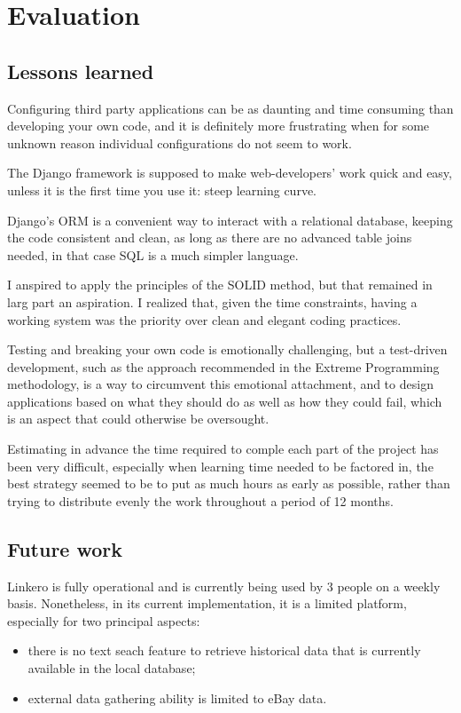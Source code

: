 \chapter{Evaluation}

\section{Lessons learned}
Configuring third party applications can be as daunting and time consuming than
developing your own code, and it is definitely more frustrating when for some
unknown reason individual configurations do not seem to work.

The Django framework is supposed to make web-developers' work quick and easy,
unless it is the first time you use it: steep learning curve.

Django's ORM is a convenient way to interact with a relational database, keeping
the code consistent and clean, as long as there are no advanced table joins
needed, in that case SQL is a much simpler language.

I anspired to apply the principles of the SOLID method, but that remained in
larg part an aspiration. I realized that, given the time constraints, having a
working system was the priority over clean and elegant coding practices.

Testing and breaking your own code is emotionally challenging, but a test-driven
development, such as the approach recommended in the Extreme Programming
methodology, is a way to circumvent this emotional attachment, and to design
applications based on what they should do as well as how they could fail, which
is an aspect that could otherwise be oversought.

Estimating in advance the time required to comple each part of the project has
been very difficult, especially when learning time needed to be factored in, the
best strategy seemed to be to put as much hours as early as possible, rather
than trying to distribute evenly the work throughout a period of 12 months.

\section{Future work}
Linkero is fully operational and is currently being used by 3 people on a weekly
basis. Nonetheless, in its current implementation, it is a limited platform,
especially for two principal aspects:
\begin{itemize}
  \item there is no text seach feature to retrieve historical data that is
  currently available in the local database;
  \item external data gathering ability is limited to eBay data.
\end{itemize}


